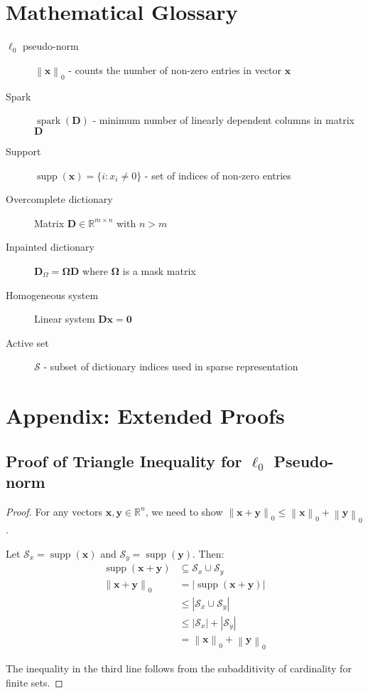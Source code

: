 \documentclass[12pt]{article}
\renewcommand{\vec}[1]{\mathbf{#1}}
\DeclareMathOperator{\spark}{spark}
\DeclareMathOperator{\supp}{supp}
\newcommand{\zeronorm}[1]{\left\|#1\right\|_0}
\newcommand{\Real}{\mathbb{R}}
\theoremstyle{definition}
\begin{document}
\newpage

\section{Mathematical Glossary}

\begin{description}
    \item[$\ell_0$ pseudo-norm] $\zeronorm{\vec{x}}$ - counts the number of non-zero entries in vector $\vec{x}$
    \item[Spark] $\spark(\mathbf{D})$ - minimum number of linearly dependent columns in matrix $\mathbf{D}$
    \item[Support] $\supp(\vec{x}) = \{i : x_i \neq 0\}$ - set of indices of non-zero entries
    \item[Overcomplete dictionary] Matrix $\mathbf{D} \in \Real^{m \times n}$ with $n > m$
    \item[Inpainted dictionary] $\mathbf{D}_{\Omega} = \mathbf{\Omega}\mathbf{D}$ where $\mathbf{\Omega}$ is a mask matrix
    \item[Homogeneous system] Linear system $\mathbf{D}\vec{x} = \vec{0}$
    \item[Active set] $\mathcal{S}$ - subset of dictionary indices used in sparse representation
\end{description}

\section{Appendix: Extended Proofs}

\subsection{Proof of Triangle Inequality for $\ell_0$ Pseudo-norm}

\begin{proof}
    For any vectors $\vec{x}, \vec{y} \in \Real^n$, we need to show $\zeronorm{\vec{x} + \vec{y}} \leq \zeronorm{\vec{x}} + \zeronorm{\vec{y}}$.

    Let $\mathcal{S}_x = \supp(\vec{x})$ and $\mathcal{S}_y = \supp(\vec{y})$. Then:
    \begin{align}
        \supp(\vec{x} + \vec{y})     & \subseteq \mathcal{S}_x \cup \mathcal{S}_y \\
        \zeronorm{\vec{x} + \vec{y}} & = |\supp(\vec{x} + \vec{y})|               \\
                                     & \leq |\mathcal{S}_x \cup \mathcal{S}_y|    \\
                                     & \leq |\mathcal{S}_x| + |\mathcal{S}_y|     \\
                                     & = \zeronorm{\vec{x}} + \zeronorm{\vec{y}}
    \end{align}

    The inequality in the third line follows from the subadditivity of cardinality for finite sets.
\end{proof}
\end{document}
